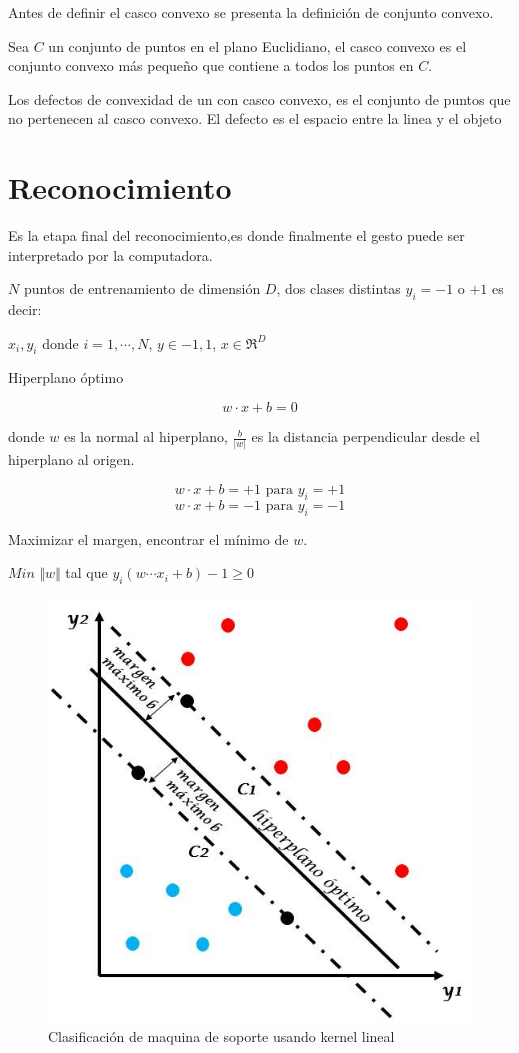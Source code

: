 Antes de definir el casco convexo se presenta la definición de conjunto convexo. 
 

Sea $C$ un conjunto de puntos en el plano Euclidiano, el casco convexo es el conjunto convexo más pequeño que contiene a todos los puntos en $C$. 

Los defectos de convexidad de un con casco convexo, es el conjunto de puntos que no pertenecen al casco convexo. El defecto es el espacio entre la linea y el objeto  



\section{Reconocimiento}\label{sec:SVM} 
Es la etapa final del reconocimiento,es donde finalmente el gesto puede ser interpretado por la computadora.  

$N$ puntos de entrenamiento de dimensión $D$, dos clases distintas $y_i=-1$
o $+1$ es decir: 

${x_i,y_i}$ donde $i=1, \cdots ,N$, $y\in{-1,1}$, $x \in \Re^D$  

Hiperplano óptimo 
 
$$ w \cdot x + b = 0$$ 

donde $w$ es la normal al hiperplano, $\frac{b}{|w|}$ es la distancia perpendicular desde el hiperplano al origen.   

$$ w \cdot x + b = +1 \textrm{ para } y_i=+1$$ 
$$ w \cdot x + b = -1 \textrm{ para } y_i=-1$$ 

Maximizar el margen, encontrar el mínimo de $w$.  

$Min$ $\Vert w \Vert$ tal que $y_i(w \cdots x_i + b) -1 \geq 0$
 
\begin{figure}[!h]
\begin{center}
\includegraphics[scale=.3]{./Figures/maquinaSoporte.jpg}
\end{center}
\caption{Clasificación de maquina de soporte usando kernel lineal}
\label{fig:SVM}
\end{figure} 


\newpage
